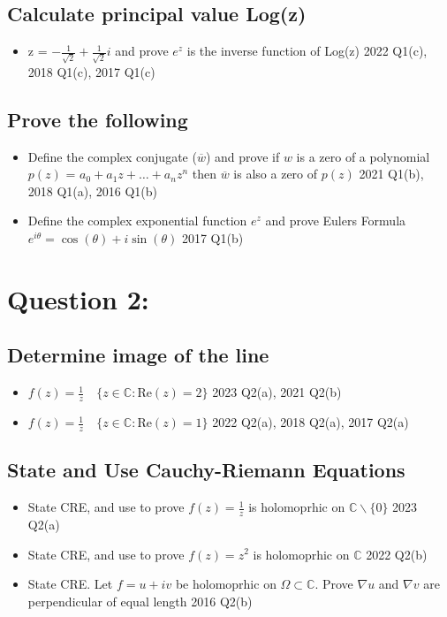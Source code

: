 \documentclass[a4paper, 8pt]{extarticle}
\begin{document}
\subsection{Calculate principal value Log(z)}
\begin{itemize}
	\item z = $-\frac{1}{\sqrt{2}} + \frac{1}{\sqrt{2}} i$ and prove $e^z$ is the inverse function of Log(z) \hfill 2022 Q1(c), 2018 Q1(c), 2017 Q1(c)
\end{itemize}
\subsection{Prove the following}
\begin{itemize}
	\item Define the complex conjugate ($\overline{w}$) and prove if $w$ is a zero of a polynomial $p(z)$ = $a_0 + a_1 z + \ldots + a_n z^n$ then $\overline{w}$ is also a zero of $p(z)$ \hfill 2021 Q1(b), 2018 Q1(a), 2016 Q1(b)
	\item Define the complex exponential function $e^z$ and prove Eulers Formula $e^{i \theta} = \cos(\theta) + i \sin(\theta)$ \hfill 2017 Q1(b)
\end{itemize}





\pagebreak


\section{Question 2: }
\subsection{Determine image of the line}
\begin{itemize}
	\item $f(z) = \frac{1}{z} \quad \{z \in \mathbb{C}: \text{Re}(z) = 2\}$ \hfill 2023 Q2(a), 2021 Q2(b)
	\item $f(z) = \frac{1}{z} \quad \{z \in \mathbb{C}: \text{Re}(z) = 1\}$ \hfill 2022 Q2(a), 2018 Q2(a), 2017 Q2(a)
\end{itemize}
\subsection{State and Use Cauchy-Riemann Equations}
\begin{itemize}
	\item State CRE, and use to prove $f(z) = \frac{1}{z}$ is holomoprhic on $\mathbb{C} \backslash \{0\}$ \hfill 2023 Q2(a)
	\item State CRE, and use to prove $f(z) = z^2$ is holomoprhic on $\mathbb{C}$ \hfill 2022 Q2(b)
	\item State CRE. Let $f = u+iv$ be holomoprhic on $\Omega \subset \mathbb{C}$. Prove $\nabla u$ and $\nabla v$ are perpendicular of equal length \hfill 2016 Q2(b)
\end{itemize}
\end{document}
